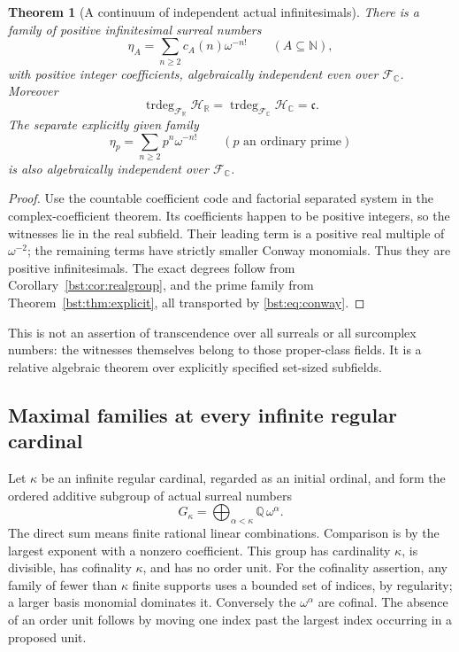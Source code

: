 \documentclass[11pt,letterpaper]{article}
\newtheorem{theorem}{Theorem}[section]
\theoremstyle{definition}
\theoremstyle{remark}
\newcommand{\Q}{\mathbb Q}
\newcommand{\R}{\mathbb R}
\newcommand{\C}{\mathbb C}
\newcommand{\N}{\mathbb N}
\newcommand{\trdeg}{\operatorname{trdeg}}
\newcommand{\cc}{\mathfrak c}
\begin{document}
\begin{theorem}[A continuum of independent actual infinitesimals]\label{bst:thm:actualreal}
There is a family of positive infinitesimal surreal numbers
\[
 \eta_A=\sum_{n\ge2}c_A(n)\omega^{-n!}\qquad(A\subseteq\N),
\]
with positive integer coefficients, algebraically independent even over
$\mathscr F_\C$. Moreover
\[
 \trdeg_{\mathscr F_\R}\mathscr H_\R
   =\trdeg_{\mathscr F_\C}\mathscr H_\C=\cc.
\]
The separate explicitly given family
\[
 \eta_p=\sum_{n\ge2}p^n\omega^{-n!}\qquad(p\text{ an ordinary prime})
\]
is also algebraically independent over $\mathscr F_\C$.
\end{theorem}
\begin{proof}
Use the countable coefficient code and factorial separated system in the
complex-coefficient theorem. Its coefficients happen to be positive
integers, so the witnesses lie in the real subfield. Their leading term
is a positive real multiple of $\omega^{-2}$; the remaining terms have
strictly smaller Conway monomials. Thus they are positive infinitesimals.
The exact degrees follow from Corollary~\ref{bst:cor:realgroup}, and the prime
family from Theorem~\ref{bst:thm:explicit}, all transported by
\eqref{bst:eq:conway}.
\end{proof}

This is not an assertion of transcendence over all surreals or all
surcomplex numbers: the witnesses themselves belong to those proper-class
fields. It is a relative algebraic theorem over explicitly specified
set-sized subfields.

\subsection{Maximal families at every infinite regular cardinal}

Let $\kappa$ be an infinite regular cardinal, regarded as an initial ordinal,
and form the ordered additive subgroup of actual surreal numbers
\begin{equation}\label{bst:eq:Gkappa}
 G_\kappa=\bigoplus_{\alpha<\kappa}\Q\,\omega^\alpha.
\end{equation}
The direct sum means finite rational linear combinations. Comparison is
by the largest exponent with a nonzero coefficient. This group has
cardinality $\kappa$, is divisible, has cofinality $\kappa$, and has no
order unit. For the cofinality assertion, any family of fewer than $\kappa$
finite supports uses a bounded set of indices, by regularity; a larger
basis monomial dominates it. Conversely the $\omega^\alpha$ are cofinal.
The absence of an order unit follows by moving one index past the largest
index occurring in a proposed unit.
\end{document}
